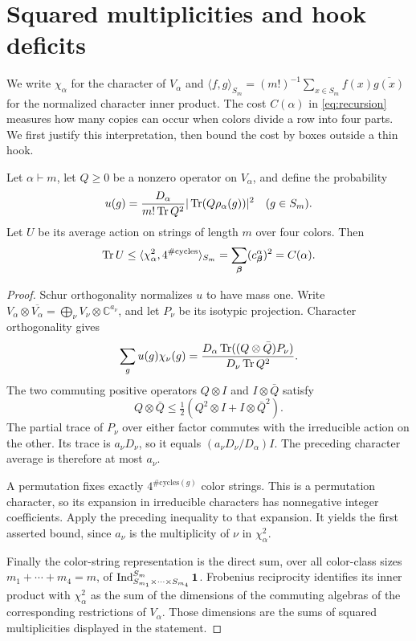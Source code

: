 \section{Squared multiplicities and hook deficits}\label{sec:multiplicities}
We write $\chi_\alpha$ for the character of $V_\alpha$ and
$\langle f,g\rangle_{S_m}=(m!)^{-1}\sum_{x\in S_m}f(x)\overline{g(x)}$ for the normalized character inner product. The cost $C(\alpha)$ in \eqref{eq:recursion} measures how many copies can occur when colors divide a row into four parts. We first justify this interpretation, then bound the cost by boxes outside a thin hook.

\begin{lemma}\label{lem:color-trace}
Let $\alpha\vdash m$, let $Q\ge0$ be a nonzero operator on $V_\alpha$, and define the probability
\[
 u(g)=\frac{D_\alpha}{m!\operatorname{Tr} Q^2}
             |\operatorname{Tr}(Q\rho_\alpha(g))|^2\quad(g\in S_m).
\]
Let $U$ be its average action on strings of length $m$ over four colors. Then
\[
 \operatorname{Tr} U\le\langle\chi_\alpha^2,4^{\#\mathrm{cycles}}\rangle_{S_m}
 =\sum_{\boldsymbol\beta}(c^{\alpha}_{\boldsymbol\beta})^2=C(\alpha).
\]
\end{lemma}
\begin{proof}
Schur orthogonality normalizes $u$ to have mass one. Write
$V_\alpha\otimes\overline{V_\alpha}=\bigoplus_\nu V_\nu\otimes\mathbb C^{a_\nu}$, and let $P_\nu$ be its isotypic projection. Character orthogonality gives
\[
 \sum_g u(g)\chi_\nu(g)
 =\frac{D_\alpha\operatorname{Tr}((Q\otimes\bar Q)P_\nu)}
               {D_\nu\operatorname{Tr} Q^2}.
\]
The two commuting positive operators $Q\otimes I$ and $I\otimes\bar Q$ satisfy
\[
 Q\otimes\bar Q\le\tfrac12(Q^2\otimes I+I\otimes\bar Q^2).
\]
The partial trace of $P_\nu$ over either factor commutes with the irreducible action on the other. Its trace is $a_\nu D_\nu$, so it equals
$(a_\nu D_\nu/D_\alpha)I$. The preceding character average is therefore at most $a_\nu$.

A permutation fixes exactly $4^{\#\mathrm{cycles}(g)}$ color strings. This is a permutation character, so its expansion in irreducible characters has nonnegative integer coefficients. Apply the preceding inequality to that expansion. It yields the first asserted bound, since $a_\nu$ is the multiplicity of $\nu$ in $\chi_\alpha^2$.

Finally the color-string representation is the direct sum, over all color-class sizes $m_1+\cdots+m_4=m$, of
$\operatorname{Ind}_{S_{m_1}\times\cdots\times S_{m_4}}^{S_m}\mathbf1$.
Frobenius reciprocity identifies its inner product with $\chi_\alpha^2$ as the sum of the dimensions of the commuting algebras of the corresponding restrictions of $V_\alpha$. Those dimensions are the sums of squared multiplicities displayed in the statement.
\end{proof}

